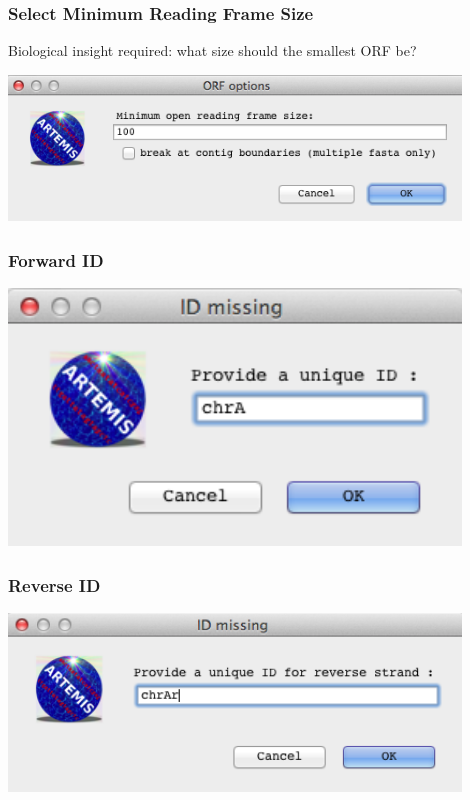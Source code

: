 \begin{frame}
  \frametitle{Select Minimum Reading Frame Size}
  Biological insight required: what size should the smallest ORF be?
  \begin{center}
    \includegraphics[width=0.9\textwidth]{images/artemis_orf1}     
  \end{center}
\end{frame}

\begin{frame}
  \frametitle{Forward ID}    
  \begin{center}
    \includegraphics[width=0.9\textwidth]{images/artemis_orf2}     
  \end{center}
\end{frame}

\begin{frame}
  \frametitle{Reverse ID}    
  \begin{center}
    \includegraphics[width=0.9\textwidth]{images/artemis_orf3}     
  \end{center}
\end{frame}

